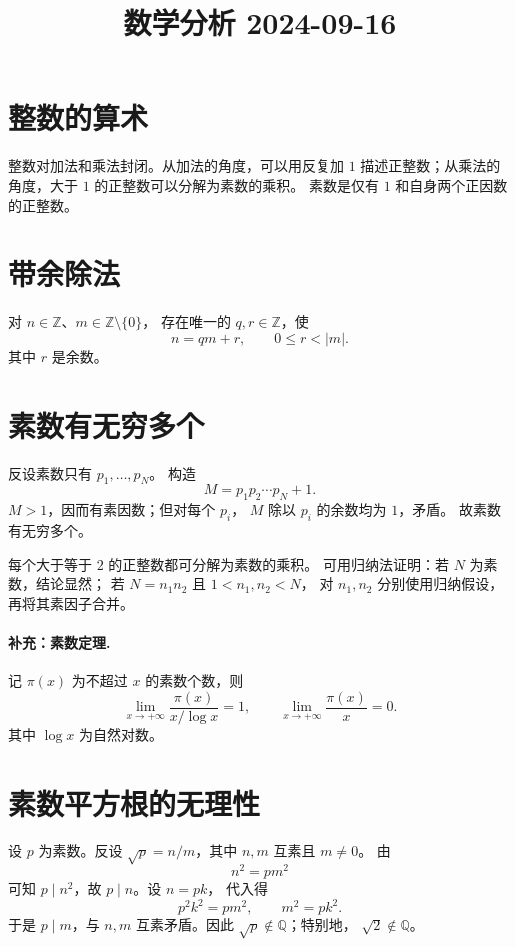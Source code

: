 \documentclass[UTF8,11pt]{ctexart}
\title{数学分析 2024-09-16}
\date{}
\theoremstyle{cnthm}
\begin{document}
\maketitle

\section{整数的算术}

整数对加法和乘法封闭。从加法的角度，可以用反复加 \(1\)
描述正整数；从乘法的角度，大于 \(1\) 的正整数可以分解为素数的乘积。
素数是仅有 \(1\) 和自身两个正因数的正整数。

\section{带余除法}

对 \(n\in\mathbb Z\)、\(m\in\mathbb Z\setminus\{0\}\)，
存在唯一的 \(q,r\in\mathbb Z\)，使
\[
n=qm+r,\qquad 0\leq r<|m|.
\]
其中 \(r\) 是余数。

\section{素数有无穷多个}

反设素数只有 \(p_1,\ldots,p_N\)。
构造
\[
M=p_1p_2\cdots p_N+1.
\]
\(M>1\)，因而有素因数；但对每个 \(p_i\)，
\(M\) 除以 \(p_i\) 的余数均为 \(1\)，矛盾。
故素数有无穷多个。

每个大于等于 \(2\) 的正整数都可分解为素数的乘积。
可用归纳法证明：若 \(N\) 为素数，结论显然；
若 \(N=n_1n_2\) 且 \(1<n_1,n_2<N\)，
对 \(n_1,n_2\) 分别使用归纳假设，再将其素因子合并。

\paragraph{补充：素数定理.}
记 \(\pi(x)\) 为不超过 \(x\) 的素数个数，则
\[
\lim_{x\to+\infty}\frac{\pi(x)}{x/\log x}=1,
\qquad
\lim_{x\to+\infty}\frac{\pi(x)}x=0.
\]
其中 \(\log x\) 为自然对数。

\section{素数平方根的无理性}

设 \(p\) 为素数。反设
\(\sqrt p=n/m\)，其中 \(n,m\) 互素且 \(m\ne0\)。
由
\[
n^2=pm^2
\]
可知 \(p\mid n^2\)，故 \(p\mid n\)。设 \(n=pk\)，
代入得
\[
p^2k^2=pm^2,\qquad m^2=pk^2.
\]
于是 \(p\mid m\)，与 \(n,m\) 互素矛盾。因此
\(\sqrt p\notin\mathbb Q\)；特别地，
\(\sqrt2\notin\mathbb Q\)。
\end{document}
